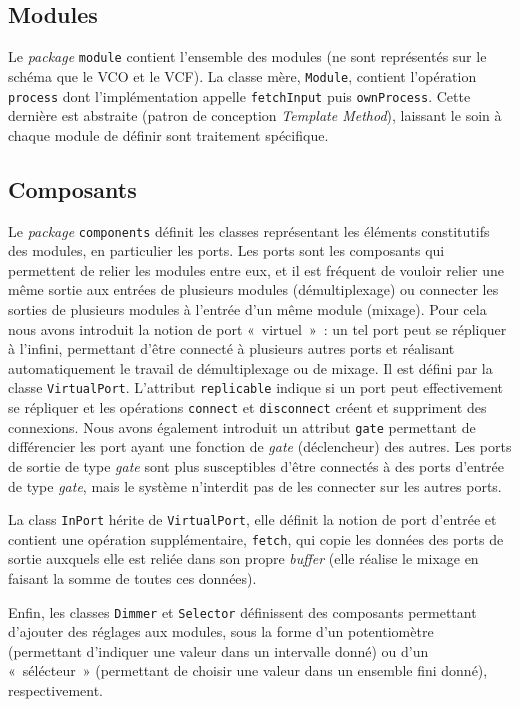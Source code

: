 \subsection{Modules}

Le \emph{package} \verb!module! contient l'ensemble des modules (ne
sont représentés sur le schéma que le VCO et le VCF). La classe
mère, \verb!Module!, contient l'opération \verb!process! dont
l'implémentation appelle \verb!fetchInput! puis \verb!ownProcess!.
Cette dernière est abstraite (patron de conception
\emph{Template Method}), laissant le soin à chaque module de
définir sont traitement spécifique.

\subsection{Composants}

Le \emph{package} \verb!components! définit les classes
représentant les éléments constitutifs des modules, en particulier
les ports. Les ports sont les composants qui permettent de relier
les modules entre eux, et il est fréquent de vouloir relier une
même sortie aux entrées de plusieurs modules (démultiplexage) ou
connecter les sorties de plusieurs modules à l'entrée d'un même
module (mixage). Pour cela nous avons introduit la notion de port
«~virtuel~»~: un tel port peut se répliquer à l'infini, permettant
d'être connecté à plusieurs autres ports et réalisant
automatiquement le travail de démultiplexage ou de mixage. Il est
défini par la classe \verb!VirtualPort!. L'attribut
\verb!replicable! indique si un port peut effectivement se
répliquer et les opérations \verb!connect! et \verb!disconnect!
créent et suppriment des connexions. Nous avons également introduit
un attribut \verb!gate! permettant de différencier les port ayant
une fonction de \emph{gate} (déclencheur) des autres. Les ports de
sortie de type \emph{gate} sont plus susceptibles d'être connectés
à des ports d'entrée de type \emph{gate}, mais le système
n'interdit pas de les connecter sur les autres ports.

La class \verb!InPort! hérite de \verb!VirtualPort!, elle définit
la notion de port d'entrée et contient une opération
supplémentaire, \verb!fetch!, qui copie les données des ports de
sortie auxquels elle est reliée dans son propre \emph{buffer} (elle
réalise le mixage en faisant la somme de toutes ces données).

Enfin, les classes \verb!Dimmer! et \verb!Selector! définissent des
composants permettant d'ajouter des réglages aux modules, sous la
forme d'un potentiomètre (permettant d'indiquer une valeur dans un
intervalle donné) ou d'un «~sélécteur~» (permettant de choisir une
valeur dans un ensemble fini donné), respectivement.

